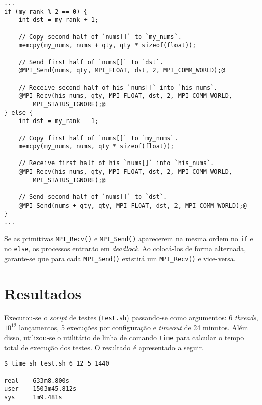 \documentclass[12pt,a4paper]{article}
\begin{document}
\begin{minipage}{\linewidth}
\begin{lstlisting}[frame=single, style=c, label={code:deadlock},
    caption={Ordem das primitivas MPI\_Send() e MPI\_Recv() na função \texttt{reduce\_sumtree()}.}]
...
if (my_rank % 2 == 0) {
    int dst = my_rank + 1;

    // Copy second half of `nums[]` to `my_nums`.
    memcpy(my_nums, nums + qty, qty * sizeof(float));

    // Send first half of `nums[]` to `dst`.
    @MPI_Send(nums, qty, MPI_FLOAT, dst, 2, MPI_COMM_WORLD);@

    // Receive second half of his `nums[]` into `his_nums`.
    @MPI_Recv(his_nums, qty, MPI_FLOAT, dst, 2, MPI_COMM_WORLD,
        MPI_STATUS_IGNORE);@
} else {
    int dst = my_rank - 1;

    // Copy first half of `nums[]` to `my_nums`.
    memcpy(my_nums, nums, qty * sizeof(float));

    // Receive first half of his `nums[]` into `his_nums`.
    @MPI_Recv(his_nums, qty, MPI_FLOAT, dst, 2, MPI_COMM_WORLD,
        MPI_STATUS_IGNORE);@

    // Send second half of `nums[]` to `dst`.
    @MPI_Send(nums + qty, qty, MPI_FLOAT, dst, 2, MPI_COMM_WORLD);@
}
...
\end{lstlisting}
\end{minipage}

Se as primitivas \texttt{MPI\_Recv()} e \texttt{MPI\_Send()} aparecerem na mesma
ordem no \texttt{if} e no \texttt{else}, os processos entrarão em
\textit{deadlock}. Ao colocá-los de forma alternada, garante-se que para cada
\texttt{MPI\_Send()} existirá um \texttt{MPI\_Recv()} e vice-versa.


\section{Resultados}
\label{sec:resultados}
Executou-se o \textit{script} de testes (\texttt{test.sh}) passando-se como
argumentos: 6 \textit{threads}, $10^{12}$ lançamentos, 5 execuções por
configuração e \textit{timeout} de 24 minutos. Além disso, utilizou-se o
utilitário de linha de comando \texttt{time} para calcular o tempo total de
execução dos testes. O resultado é apresentado a seguir.

\begin{verbatim}
$ time sh test.sh 6 12 5 1440

real    633m8.800s
user    1503m45.812s
sys     1m9.481s
\end{verbatim}
\end{document}
